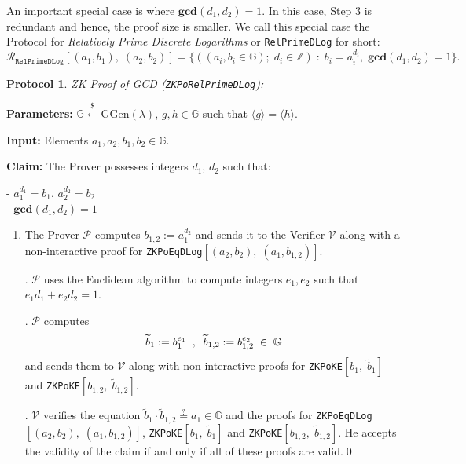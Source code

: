 \documentclass[11pt, lettersize, notitlepage, leqno, footskip=0.6cm]{article}
\newcommand{\bz}{\mathbb Z}
\newcommand{\ttt}{\texttt}
\newcommand{\bG}{\mathbb{G}}
\newcommand{\la}{\langle}
\newcommand{\ra}{\rangle}
\newcommand{\wti}{\widetilde}
\newcommand{\mc}{\mathcal}
\newcommand{\mb}{\mathbb}
\newcommand{\mbf}{\mathbf}
\newcommand{\mr}{\mathrm}
\newcommand{\lamb}{\lambda}
\newcommand{\V}{\mc{V}}
\newcommand{\vs}{\vspace{-0.15cm}}
\newcommand{\noin}{\noindent}
\newcommand{\GCD}{\mbf{gcd}}
\newtheorem{Prot}[Thm]{Protocol}
\numberwithin{equation}{section}
\begin{document}
\noin An important special case is where $\GCD(d_1, d_2) = 1$. In this case, Step 3 is redundant and hence, the proof size is smaller. We call this special case the Protocol for \textit{Relatively Prime Discrete Logarithms} or \verb|RelPrimeDLog| for short:\vs \[\mc{R}_{{\ttt{RelPrimeDLog}}}[(a_1,b_1),\;(a_2,b_2)] = \big\{((a_i, b_i\in\mb{G});\;d_i\in\bz)\;:\; b_i = a_i^{d_i},\;\GCD(d_1,d_2)=1 \big\} .\] 



\begin{Prot} \normalfont \hypertarget{GCDPed}{\textit{ZK Proof of GCD}} (\verb|ZKPoRelPrimeDLog|):\end{Prot} \vspace{-0.3cm}

\noin \textbf{Parameters:} $\mb{G}\xleftarrow{\$} \mr{GGen}(\lamb)$,  $g,h\in \mb{G}$ such that $\la g \ra = \la h \ra$.

\noin \textbf{Input:} Elements $a_1, a_2, b_1, b_2 \in \mb{G}$. 

\noin \textbf{Claim:} The Prover possesses integers $d_1$, $d_2$ such that:

\noin - $a_1^{d_1} = b_1$, $a_2^{d_2} = b_2$\\
\noin - $\GCD(d_1, d_2) = 1$
 

\begin{enumerate}[wide, labelwidth=!, labelindent=0pt]\vs \item The Prover $\mc{P}$ computes $b_{1,2}:= a_1^{d_2}$ and sends it to the Verifier $\V$ along with a\\ non-interactive proof for \verb|ZKPoEqDLog|$[(a_2, b_2),\; (a_1, b_{1,2})]$.

\noin 2. $\mc{P}$ uses the Euclidean algorithm to compute integers $e_1, e_2$ such that $e_1d_1 + e_2d_2 = 1$.

\noin 3. $\mc{P}$ computes \vs $$\wti{b}_1:= b_1^{e_1}\;\;,\;\; \wti{b}_{1,2}:= b_{1,2}^{e_2}\;\in\;\bG \vs $$ and sends them to $\V$ along with non-interactive proofs for \verb|ZKPoKE|$[b_1,\; \wti{b}_1]$ and \verb|ZKPoKE|$[b_{1,2},\; \wti{b}_{1,2}]$.

\noin 4. $\mc{V}$ verifies the equation $\wti{b}_1\cdot\wti{b}_{1,2}\stackrel{?}{=} a_1\in\bG $ and the proofs for \verb|ZKPoEqDLog|$[(a_2, b_2),\; (a_1, b_{1,2})]$, \verb|ZKPoKE|$[b_1,\; \wti{b}_1]$ and \verb|ZKPoKE|$[b_{1,2},\; \wti{b}_{1,2}]$. He accepts the validity of the claim if and only if all of these proofs are valid.\qed \end{enumerate}
\end{document}
